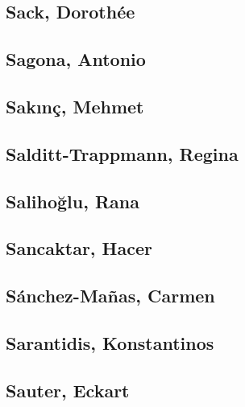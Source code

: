 \subsection[Sack, Dorothée (1)]{Sack, Dorothée}

\subsection[Sagona, Antonio (1)]{Sagona, Antonio}

\subsection[Sakınç, Mehmet (1)]{Sakınç, Mehmet}

\subsection[Salditt-Trappmann, Regina (1)]{Salditt-Trappmann, Regina}

\subsection[Salihoğlu, Rana (1)]{Salihoğlu, Rana}

\subsection[Sancaktar, Hacer (1)]{Sancaktar, Hacer}

\subsection[Sánchez-Mañas, Carmen (1)]{Sánchez-Mañas, Carmen}

\subsection[Sarantidis, Konstantinos (2)]{Sarantidis, Konstantinos}


\subsection[Sauter, Eckart (1)]{Sauter, Eckart}

